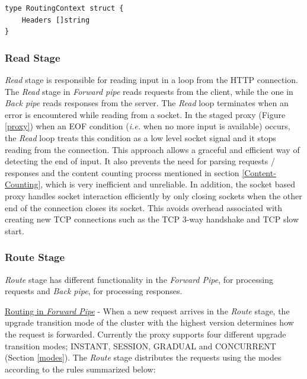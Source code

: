 \documentclass[a4paper,11pt,twoside]{report}
\begin{document}
\begin{lstlisting}[language=terminal]
type RoutingContext struct {
	Headers []string
}
\end{lstlisting} 

\subsubsection*{Read Stage} 
\textit{Read} stage is responsible for reading input in a loop from the HTTP connection. The \textit{Read} stage in \textit{Forward pipe} reads requests from the client, while the one in \textit{Back pipe} reads responses from the server. The \textit{Read} loop terminates when an error is encountered while reading from a socket. In the staged proxy (Figure \ref{proxy}) when an EOF condition (\textit{i.e.} when no more input is available) occurs, the \textit{Read} loop treats this condition as a low level socket signal and it stops reading from the connection. This approach allows a graceful and efficient way of detecting the end of input. It also prevents the need for parsing requests / responses and the content counting process mentioned in section \ref{Content-Counting}, which is very inefficient and unreliable.  In addition, the socket based proxy handles socket interaction efficiently by only closing sockets when the other end of the connection closes its socket.  This avoids overhead associated with creating new TCP connections such as the TCP 3-way handshake and TCP slow start.

\subsubsection*{Route Stage} \label{route-stage} 
\textit{Route} stage has different functionality in the \textit{Forward Pipe}, for processing requests and \textit{Back pipe}, for processing responses. \bigskip  

\noindent
\underline{Routing in \textit{Forward Pipe}} - When a new request arrives in the \textit{Route} stage, the upgrade transition mode of the cluster with the highest version determines how the request is forwarded. Currently the proxy supports four different upgrade transition modes; INSTANT, SESSION, GRADUAL and CONCURRENT (Section \ref{modes}). The \textit{Route} stage distributes the requests using the modes according to the rules summarized below: 
\end{document}
